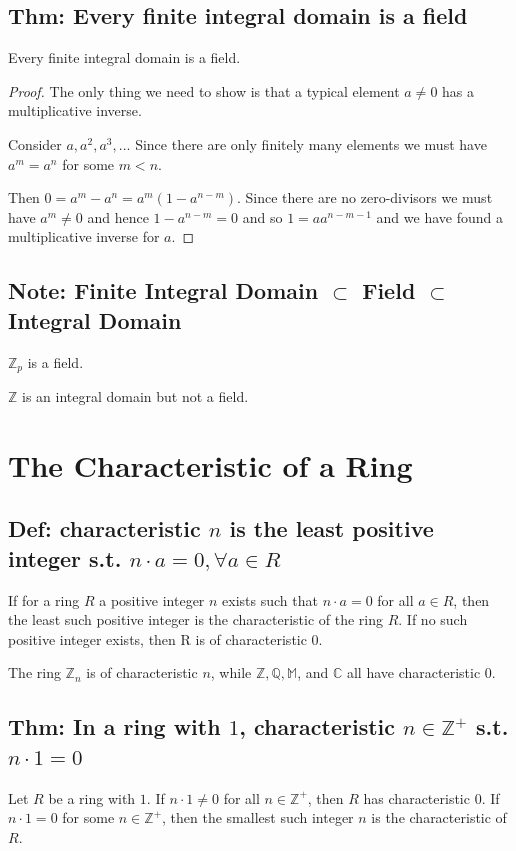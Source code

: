 \documentclass[11pt]{elegantbook}
\begin{document}
\subsection{Thm: Every finite integral domain is a field}
\begin{theorem}
    Every finite integral domain is a field.
\end{theorem}
\begin{proof}
The only thing we need to show is that a typical element $a \neq 0$ has a multiplicative inverse.

Consider $a, a^2, a^3, ...$ Since there are only finitely many elements we must have $a^m = a^n$ for some $m < n$.

Then $0 = a^m - a^n = a^m(1 - a^{n-m})$. Since there are no zero-divisors we must have $a^m \neq 0$ and hence $1 - a^{n-m} = 0$ and so $1 = a a^{n-m-1}$ and we have found a multiplicative inverse for $a$.
\end{proof}

\subsection{Note: Finite Integral Domain $\subset$ Field $\subset$ Integral Domain}
$\mathbb{Z}_p$ is a field.

$\mathbb{Z}$ is an integral domain but not a field.

\section{The Characteristic of a Ring}
\subsection{Def: characteristic $n$ is the least positive integer s.t. $n\cdot a=0,\forall a\in R$}
\begin{definition}
    If for a ring $R$ a positive integer $n$ exists such that $n \cdot a = 0$ for all $a\in R$, then the least such positive integer is the characteristic of the ring $R$. If no such positive integer exists, then R is of characteristic $0$.
\end{definition}
\begin{example}
    The ring $\mathbb{Z}_n$ is of characteristic $n$, while $\mathbb{Z}, \mathbb{Q}, \mathbb{M}$, and $\mathbb{C}$ all have characteristic $0$.
\end{example}

\subsection{Thm: In a ring with $1$, characteristic $n\in \mathbb{Z}^+$ s.t. $n\cdot 1=0$}
\begin{theorem}
    Let $R$ be a ring with $1$. If $n \cdot 1 \neq 0$ for all $n\in \mathbb{Z}^+$, then $R$ has characteristic $0$. If
    $n \cdot 1 = 0$ for some $n\in \mathbb{Z}^+$, then the smallest such integer $n$ is the characteristic of $R$.
\end{theorem}
\end{document}
